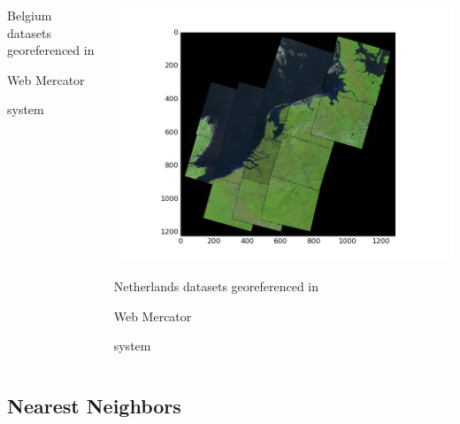 \documentclass[c]{beamer}
\begin{document}
\begin{frame}
\begin{itemize}
{\begin{columns}
\begin{column}{0.33\textwidth}
\begin{overlayarea}{\linewidth}{3cm}
  \end{overlayarea}
  \begin{overlayarea}{\linewidth}{1cm}
    \centering
    \tiny Belgium datasets georeferenced in \begin{itshape}Web Mercator\end{itshape} system\par
  \end{overlayarea}
  \end{column}
  \begin{column}{0.33\textwidth}
  \begin{overlayarea}{\linewidth}{3cm}
    \centering\vfill
    \includegraphics[scale=0.20]{../../data/Pays-Bas/covering-selection.png}
  \end{overlayarea}
  \begin{overlayarea}{\linewidth}{1cm}
    \centering
    \tiny Netherlands datasets georeferenced in \begin{itshape}Web Mercator\end{itshape} system\par
  \end{overlayarea}
  \end{column}
 \end{columns}
}
\end{itemize}

\end{frame}


\subsection{Nearest Neighbors}
\begin{frame}
\tableofcontents[currentsubsection]
\end{frame}
\end{document}
